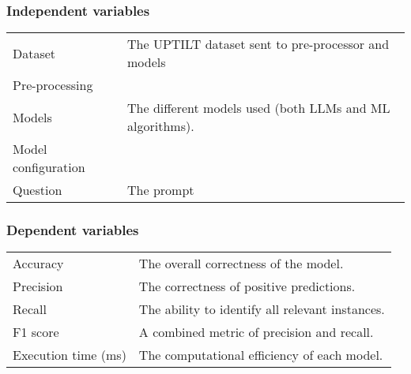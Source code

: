 \subsubsection{Independent variables}
%
%
%
\begin{center}
    \begin{tabular}{| l  |l |}
        Dataset & The UPTILT dataset sent to pre-processor and models\\
 Pre-processing&\\
        Models & The different models used (both LLMs and ML algorithms). \\
 Model configuration&\\
 Question &The prompt\\
    \end{tabular}
\end{center}

\subsubsection{Dependent variables}
%
\begin{center}
    \begin{tabular}{| l | l |}
        Accuracy            & The overall correctness of the model.           \\
        Precision           & The correctness of positive predictions.        \\
        Recall              & The ability to identify all relevant instances. \\
        F1 score            & A combined metric of precision and recall.      \\
        Execution time (ms) & The computational efficiency of each model.     \\
    \end{tabular}
\end{center}

